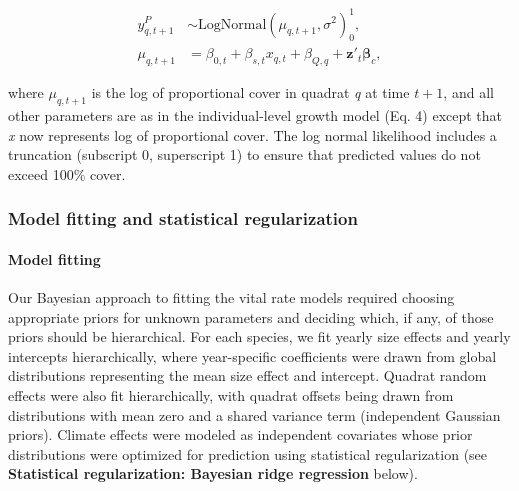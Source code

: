\documentclass[12pt,]{article}
\begin{document}
\vspace{-3em}\begin{align}
y_{q,t+1}^{P} &\sim \text{LogNormal}(\mu_{q,t+1}, \sigma^2)_{0}^{1}, \\
\mu_{q,t+1} &= \beta_{0,t} + \beta_{s,t}x_{q,t} + \beta_{Q,q} + \textbf{z}'_t \boldsymbol{\beta}_c,
\end{align}\vspace{-3em}

where \(\mu_{q,t+1}\) is the log of proportional cover in quadrat
\emph{q} at time \(t+1\), and all other parameters are as in the
individual-level growth model (Eq. 4) except that \emph{x} now
represents log of proportional cover. The log normal likelihood includes
a truncation (subscript 0, superscript 1) to ensure that predicted
values do not exceed 100\% cover.

\subsubsection{Model fitting and statistical
regularization}\label{model-fitting-and-statistical-regularization}

\paragraph{Model fitting}\label{model-fitting}

Our Bayesian approach to fitting the vital rate models required choosing
appropriate priors for unknown parameters and deciding which, if any, of
those priors should be hierarchical. For each species, we fit yearly
size effects and yearly intercepts hierarchically, where year-specific
coefficients were drawn from global distributions representing the mean
size effect and intercept. Quadrat random effects were also fit
hierarchically, with quadrat offsets being drawn from distributions with
mean zero and a shared variance term (independent Gaussian priors).
Climate effects were modeled as independent covariates whose prior
distributions were optimized for prediction using statistical
regularization (see \textbf{Statistical regularization: Bayesian ridge
regression} below).
\end{document}
